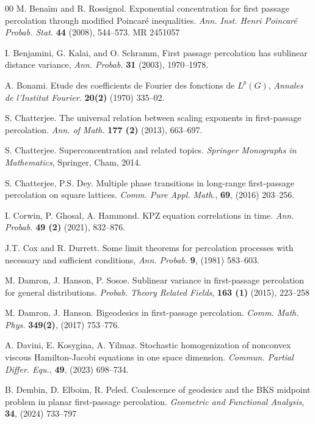 \documentclass[reqno]{amsart}
\begin{document}
\begin{thebibliography}{00}
 M. Bena\"im and R. Rossignol. Exponential concentration for first passage percolation through modified Poincar\'e inequalities. {\em Ann. Inst. Henri Poincar\'e Probab. Stat.} {\bf 44} (2008), 544--573. MR 2451057 


 I. Benjamini, G. Kalai, and O. Schramm, First passage percolation has
sublinear distance variance, {\em Ann. Probab.} {\bf 31} (2003), 1970--1978. 

 
 A. Bonami. Etude des coefficients de Fourier des fonctions de $L^p(G)$, {\em Annales de l’Institut Fourier.}
{\bf 20(2)} (1970) 335--02.

 S. Chatterjee. The universal relation between scaling exponents in first-passage
percolation. {\em Ann. of Math.} {\bf 177 (2)}   (2013), 663--697. 

 S. Chatterjee. Superconcentration and related topics. {\em Springer Monographs in Mathematics}, Springer, Cham, 2014.


 S. Chatterjee, P.S. Dey. 
Multiple phase transitions in long-range first‐passage percolation on square lattices.
{\em Comm. Pure Appl. Math.}, {\bf 69},  (2016) 203--256.


 I. Corwin, P. Ghosal, A. Hammond. KPZ equation correlations in time. 
 {\em Ann. Probab.} {\bf 49 (2)} (2021), 832--876. 

 J.T. Cox and R. Durrett. Some limit theorems for percolation processes with
necessary and sufficient conditions, {\em Ann. Probab.} {\bf 9}, (1981) 583--603.


 M. Damron, J. Hanson, P. Sosoe. Sublinear variance in first-passage percolation for general distributions.
{\em Probab. Theory Related Fields}, {\bf 163 (1)}  (2015), 223--258


 M. Damron, J. Hanson. Bigeodesics in first-passage percolation.  {\em Comm. Math. Phys.} {\bf 349(2)}, (2017) 753--776.

A. Davini, E. Kosygina, A. Yilmaz. Stochastic homogenization of nonconvex viscous Hamilton-Jacobi equations in one space dimension. {\em Commun. Partial Differ. Equ.}, {\bf 49}, (2023) 698--734.

 B. Dembin, D. Elboim, R. Peled.  Coalescence of geodesics and the BKS midpoint problem in planar first-passage percolation.
{\em Geometric and Functional Analysis}, {\bf 34}, (2024)  733--797 


\end{thebibliography}
\end{document}
